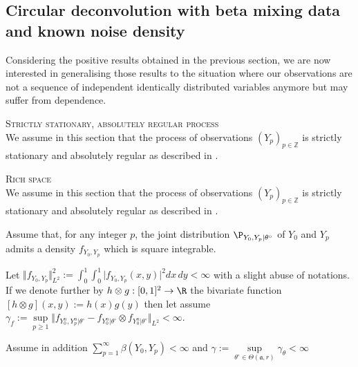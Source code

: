 \subsection{Circular deconvolution with beta mixing data and known noise density}\label{FREQ_CIRCDECONV_KNOWN_BETA}

Considering the positive results obtained in the previous section, we are now interested in generalising those results to the situation where our observations are not a sequence of independent identically distributed variables anymore but may suffer from dependence.

\begin{as}{\textsc{Strictly stationary, absolutely regular process} \\}\label{AS_FREQ_CIRCDECONV_KNOWN_BETA_STRICTLYSTA}
We assume in this section that the process of observations $(Y_{p})_{p \in \mathds{Z}}$ is strictly stationary and absolutely regular as described in .
\end{as}

\begin{as}{\textsc{Rich space} \\}\label{AS_FREQ_CIRCDECONV_KNOWN_BETA_RICHSPACE}
We assume in this section that the process of observations $(Y_{p})_{p \in \mathds{Z}}$ is strictly stationary and absolutely regular as described in .
\end{as}

\begin{as}\label{AS_FREQ_CIRCDECONV_KNOWN_BETA_JOINT}
Assume that, for any integer $p$, the joint distribution $\P_{Y_{0}, Y_{p} \vert \theta^{\circ}}$ of $Y_{0}$ and $Y_{p}$ admits a density $f_{Y_{0}, Y_{p}}$ which is square integrable.

Let $\Vert f_{Y_{0}, Y_{p}} \Vert_{L^{2}}^{2} := \int_{0}^{1} \int_{0}^{1} \vert f_{Y_{0}, Y_{p}}(x, y)\vert^{2}dx \, dy < \infty$ with a slight abuse of notations.
If we denote further by $h \otimes g : [0, 1]^{2} \rightarrow \R$ the bivariate function $[h \otimes g](x, y) := h(x) g(y)$ then let assume $\gamma_{f} := \sup\limits_{p \geq 1} \Vert f_{Y_{0}^{n}, Y_{p}^{n}\vert \theta^{\circ}} - f_{Y_{0}^{n}\vert \theta^{\circ}} \otimes f_{Y_{0}^{n}\vert \theta^{\circ}} \Vert_{L^{2}} < \infty$.

Assume in addition $\sum\limits_{p = 1}^{\infty} \beta(Y_{0}, Y_{p}) < \infty$ and $\gamma := \sup\limits_{\theta^{\circ} \in \Theta(\mathfrak{a}, r)} \gamma_{\theta} < \infty$
\end{as}

